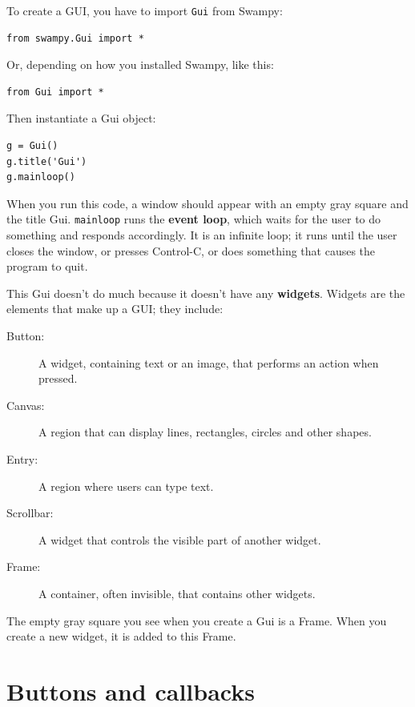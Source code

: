 \documentclass[10pt]{book}
\begin{document}
To create a GUI, you have to import {\tt Gui} from Swampy:
%
\begin{verbatim}
from swampy.Gui import *
\end{verbatim}
%
Or, depending on how you installed Swampy, like this:
%
\begin{verbatim}
from Gui import *
\end{verbatim}
%
Then instantiate a Gui object:
%
\begin{verbatim}
g = Gui()
g.title('Gui')
g.mainloop()
\end{verbatim}
%
When you run this code, a window should appear with an empty gray
square and the title {\sf Gui}.  {\tt mainloop} runs the {\bf event
  loop}, which waits for the user to do something and responds
accordingly.  It is an infinite loop; it runs until the user closes
the window, or presses Control-C, or does something that causes the
program to quit.

This Gui doesn't do much because it doesn't have any
{\bf widgets}.  Widgets are the elements that make up a
GUI; they include:

\begin{description}

\item[Button:] A widget, containing text or an image, that
performs an action when pressed.

\item[Canvas:] A region that can display lines, rectangles,
circles and other shapes.

\item[Entry:] A region where users can type text.

\item[Scrollbar:] A widget that controls the visible part of another
widget.

\item[Frame:] A container, often invisible, that contains other
widgets.

\end{description}

The empty gray square you see when you create a Gui is
a Frame.  When you create a new widget, it is added to this Frame.



\section{Buttons and callbacks}
\end{document}
